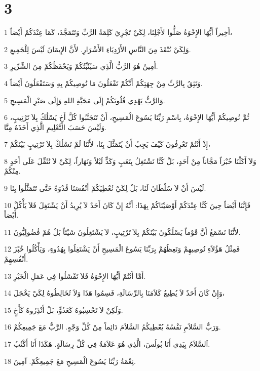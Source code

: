 \chapter{3}

\par 1 أَخِيراً أَيُّهَا الإِخْوَةُ صَلُّوا لأَجْلِنَا، لِكَيْ تَجْرِيَ كَلِمَةُ الرَّبِّ وَتَتَمَجَّدَ، كَمَا عِنْدَكُمْ أَيْضاً،
\par 2 وَلِكَيْ نُنْقَذَ مِنَ النَّاسِ الأَرْدِيَاءِ الأَشْرَارِ. لأَنَّ الإِيمَانَ لَيْسَ لِلْجَمِيعِ.
\par 3 أَمِينٌ هُوَ الرَّبُّ الَّذِي سَيُثَبِّتُكُمْ وَيَحْفَظُكُمْ مِنَ الشِّرِّيرِ.
\par 4 وَنَثِقُ بِالرَّبِّ مِنْ جِهَتِكُمْ أَنَّكُمْ تَفْعَلُونَ مَا نُوصِيكُمْ بِهِ وَسَتَفْعَلُونَ أَيْضاً.
\par 5 وَالرَّبُّ يَهْدِي قُلُوبَكُمْ إِلَى مَحَبَّةِ اللهِ وَإِلَى صَبْرِ الْمَسِيحِ.
\par 6 ثُمَّ نُوصِيكُمْ أَيُّهَا الإِخْوَةُ، بِاسْمِ رَبِّنَا يَسُوعَ الْمَسِيحِ، أَنْ تَتَجَنَّبُوا كُلَّ أَخٍ يَسْلُكُ بِلاَ تَرْتِيبٍ، وَلَيْسَ حَسَبَ التَّعْلِيمِ الَّذِي أَخَذَهُ مِنَّا.
\par 7 إِذْ أَنْتُمْ تَعْرِفُونَ كَيْفَ يَجِبُ أَنْ يُتَمَثَّلَ بِنَا، لأَنَّنَا لَمْ نَسْلُكْ بِلاَ تَرْتِيبٍ بَيْنَكُمْ،
\par 8 وَلاَ أَكَلْنَا خُبْزاً مَجَّاناً مِنْ أَحَدٍ، بَلْ كُنَّا نَشْتَغِلُ بِتَعَبٍ وَكَدٍّ لَيْلاً وَنَهَاراً، لِكَيْ لاَ نُثَقِّلَ عَلَى أَحَدٍ مِنْكُمْ.
\par 9 لَيْسَ أَنْ لاَ سُلْطَانَ لَنَا، بَلْ لِكَيْ نُعْطِيَكُمْ أَنْفُسَنَا قُدْوَةً حَتَّى تَتَمَثَّلُوا بِنَا.
\par 10 فَإِنَّنَا أَيْضاً حِينَ كُنَّا عِنْدَكُمْ أَوْصَيْنَاكُمْ بِهَذَا: أَنَّهُ إِنْ كَانَ أَحَدٌ لاَ يُرِيدُ أَنْ يَشْتَغِلَ فَلاَ يَأْكُلْ أَيْضاً.
\par 11 لأَنَّنَا نَسْمَعُ أَنَّ قَوْماً يَسْلُكُونَ بَيْنَكُمْ بِلاَ تَرْتِيبٍ، لاَ يَشْتَغِلُونَ شَيْئاً بَلْ هُمْ فُضُولِيُّونَ.
\par 12 فَمِثْلُ هَؤُلاَءِ نُوصِيهِمْ وَنَعِظُهُمْ بِرَبِّنَا يَسُوعَ الْمَسِيحِ أَنْ يَشْتَغِلُوا بِهُدُوءٍ، وَيَأْكُلُوا خُبْزَ أَنْفُسِهِمْ.
\par 13 أَمَّا أَنْتُمْ أَيُّهَا الإِخْوَةُ فَلاَ تَفْشَلُوا فِي عَمَلِ الْخَيْرِ.
\par 14 وَإِنْ كَانَ أَحَدٌ لاَ يُطِيعُ كَلاَمَنَا بِالرِّسَالَةِ، فَسِمُوا هَذَا وَلاَ تُخَالِطُوهُ لِكَيْ يَخْجَلَ،
\par 15 وَلَكِنْ لاَ تَحْسِبُوهُ كَعَدُوٍّ، بَلْ أَنْذِرُوهُ كَأَخٍ.
\par 16 وَرَبُّ السَّلاَمِ نَفْسُهُ يُعْطِيكُمُ السَّلاَمَ دَائِماً مِنْ كُلِّ وَجْهٍ. الرَّبُّ مَعَ جَمِيعِكُمْ.
\par 17 اَلسَّلاَمُ بِيَدِي أَنَا بُولُسَ، الَّذِي هُوَ عَلاَمَةٌ فِي كُلِّ رِسَالَةٍ. هَكَذَا أَنَا أَكْتُبُ.
\par 18 نِعْمَةُ رَبِّنَا يَسُوعَ الْمَسِيحِ مَعَ جَمِيعِكُمْ. آمِينَ.

